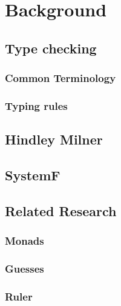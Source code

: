 \chapter{Background}
\section{Type checking}
\subsection{Common Terminology}
\subsection{Typing rules}
\section{Hindley Milner}
\section{SystemF}
\section{Related Research}
\subsection{Monads}
\subsection{Guesses}
\subsection{Ruler}

